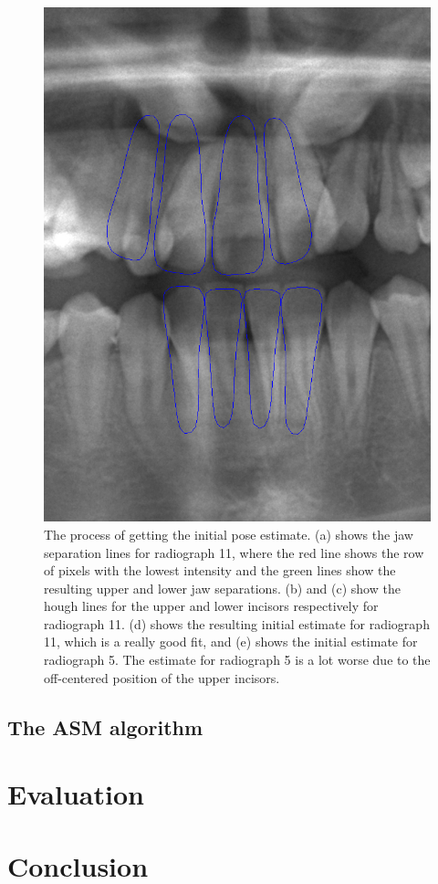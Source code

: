 \documentclass[a4paper,titlepage,12pt]{article}
\begin{document}
\begin{figure}
\begin{minipage}[b]{0.32\linewidth}
	\end{minipage}
	\begin{minipage}[b]{0.32\linewidth}
		\includegraphics[width=\linewidth]{init/initial6.png}
	\end{minipage}
  \caption{
		The process of getting the initial pose estimate. (a) shows the jaw separation lines for radiograph 11, where the red line shows the row of pixels with the lowest intensity and the green lines show the resulting upper and lower jaw separations.
		(b) and (c) show the hough lines for the upper and lower incisors respectively for radiograph 11.
		(d) shows the resulting initial estimate for radiograph 11, which is a really good fit, and (e) shows the initial estimate for radiograph 5.
		The estimate for radiograph 5 is a lot worse due to the off-centered position of the upper incisors.} \label{init}
\end{figure}

\subsection{The ASM algorithm}
\label{subsec:ASM}

\section{Evaluation}


\section{Conclusion}




\end{document}

